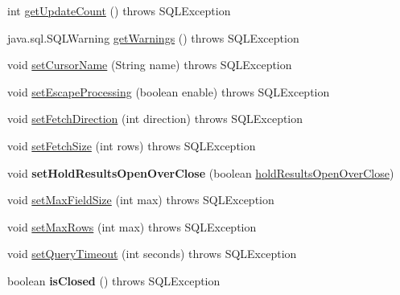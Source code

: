 \begin{DoxyCompactItemize}
\item 
int \mbox{\hyperlink{classcom_1_1mysql_1_1jdbc_1_1_statement_impl_a5e320d2717fe1d637befef4f837719b6}{get\+Update\+Count}} ()  throws S\+Q\+L\+Exception 
\item 
java.\+sql.\+S\+Q\+L\+Warning \mbox{\hyperlink{classcom_1_1mysql_1_1jdbc_1_1_statement_impl_ab213540e1a8c3dc18168ef8b9cbfe29e}{get\+Warnings}} ()  throws S\+Q\+L\+Exception 
\item 
void \mbox{\hyperlink{classcom_1_1mysql_1_1jdbc_1_1_statement_impl_af3716cf80407d6b26b74ddda64c7c4e5}{set\+Cursor\+Name}} (String name)  throws S\+Q\+L\+Exception 
\item 
void \mbox{\hyperlink{classcom_1_1mysql_1_1jdbc_1_1_statement_impl_abf630b98fd3807a2973262747e98e9fd}{set\+Escape\+Processing}} (boolean enable)  throws S\+Q\+L\+Exception 
\item 
void \mbox{\hyperlink{classcom_1_1mysql_1_1jdbc_1_1_statement_impl_aebc30908694e5ae2bc3cec1738bbf2e4}{set\+Fetch\+Direction}} (int direction)  throws S\+Q\+L\+Exception 
\item 
void \mbox{\hyperlink{classcom_1_1mysql_1_1jdbc_1_1_statement_impl_a5e92dd77e4ff9bf65cff4f50e63a1045}{set\+Fetch\+Size}} (int rows)  throws S\+Q\+L\+Exception 
\item 
\mbox{\label{classcom_1_1mysql_1_1jdbc_1_1_statement_impl_ac1c87a52b2dd4dfdda54d5ee05ce0b31}} 
void {\bfseries set\+Hold\+Results\+Open\+Over\+Close} (boolean \mbox{\hyperlink{classcom_1_1mysql_1_1jdbc_1_1_statement_impl_adb96342ca6273a9abdc79673a890fd74}{hold\+Results\+Open\+Over\+Close}})
\item 
void \mbox{\hyperlink{classcom_1_1mysql_1_1jdbc_1_1_statement_impl_a21c0da8a415543b37cf396f85ba77ef8}{set\+Max\+Field\+Size}} (int max)  throws S\+Q\+L\+Exception 
\item 
void \mbox{\hyperlink{classcom_1_1mysql_1_1jdbc_1_1_statement_impl_a06eb1d241e4ca066606cbf1a1e04e87c}{set\+Max\+Rows}} (int max)  throws S\+Q\+L\+Exception 
\item 
void \mbox{\hyperlink{classcom_1_1mysql_1_1jdbc_1_1_statement_impl_a74950809ec8d20dc5df1e6163120b342}{set\+Query\+Timeout}} (int seconds)  throws S\+Q\+L\+Exception 
\item 
\mbox{\label{classcom_1_1mysql_1_1jdbc_1_1_statement_impl_a23a53c87fce4d9c80c22b5c778c399fc}} 
boolean {\bfseries is\+Closed} ()  throws S\+Q\+L\+Exception 

\end{DoxyCompactItemize}
